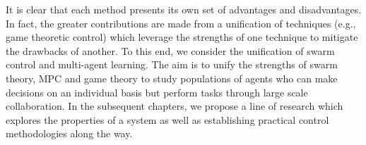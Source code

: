 \documentclass[.../main.tex]{subfiles}
\begin{document}
It is clear that each method presents its own set of advantages and
disadvantages. In fact, the greater contributions are made from a
unification of techniques (e.g., game theoretic control) which leverage
the strengths of one technique to mitigate the drawbacks of
another. To this end, we consider the unification of swarm control and
multi-agent learning. The aim is to unify the strengths of swarm
theory, MPC and game theory to study populations of agents who can
make decisions on an individual basis but perform tasks through large
scale collaboration. In the subsequent chapters, we propose a line of
research which explores the properties of a system as well as
establishing practical control methodologies along the way.
\end{document}
